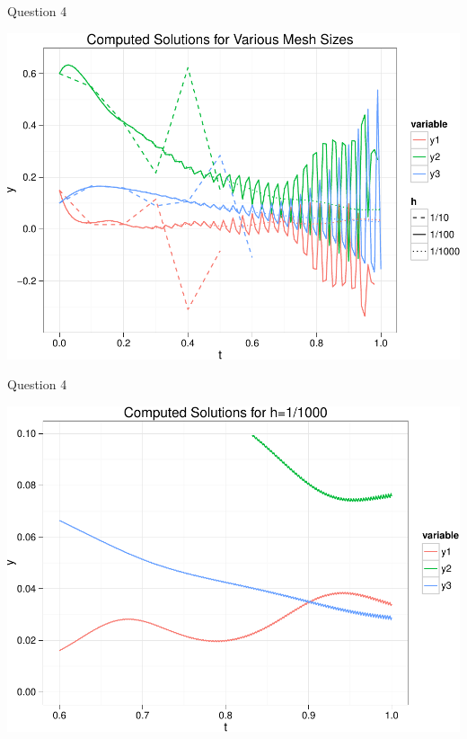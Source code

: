 \documentclass{beamer}
\begin{document}
\begin{frame}{Question 4}
	\begin{center}
		\includegraphics[width=\textwidth]{plot-crop.pdf}
	\end{center}
\end{frame}

\begin{frame}{Question 4}
	\begin{center}
		\includegraphics[width=\textwidth]{plot-small-crop.pdf}
	\end{center}
\end{frame}
\end{document}
